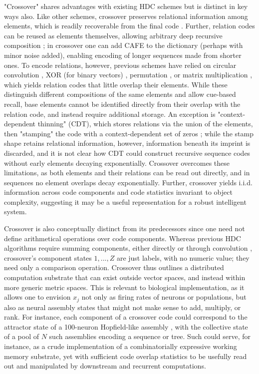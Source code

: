 \documentclass{article}
\begin{document}
"Crossover" shares advantages with existing HDC schemes but is distinct in key ways also. Like other schemes, crossover preserves relational information among elements, which is readily recoverable from the final code \cite{Kanerva:2009}. Further, relation codes can be reused as elements themselves, allowing arbitrary deep recursive composition \cite{Kanerva:2009}; in crossover one can add CAFE to the dictionary (perhaps with minor noise added), enabling encoding of longer sequences made from shorter ones. To encode relations, however, previous schemes have relied on circular convolution \cite{Plate:1995}, XOR (for binary vectors) \cite{Kanerva:1994}, permutation \cite{Sahlgren:2008, Gayler:1998}, or matrix multiplication \cite{Gosmann:2019}, which yields relation codes that little overlap their elements. While these distinguish different compositions of the same elements and allow cue-based recall, base elements cannot be identified directly from their overlap with the relation code, and instead require additional storage. An exception is "context-dependent thinning" (CDT), which stores relations via the union of the elements, then "stamping" the code with a context-dependent set of zeros \cite{Rachkovskij:2001}; while the stamp shape retains relational information, however, information beneath its imprint is discarded, and it is not clear how CDT could construct recursive sequence codes without early elements decaying exponentially. Crossover overcomes these limitations, as both elements and their relations can be read out directly, and in sequences no element overlaps decay exponentially. Further, crossover yields i.i.d. information across code components and code statistics invariant to object complexity, suggesting it may be a useful representation for a robust intelligent system.

Crossover is also conceptually distinct from its predecessors since one need not define arithmetical operations over code components. Whereas previous HDC algorithms require summing components, either directly or through convolution \cite{Plate:1995, Kanerva:1994, Gayler:1998, Rachkovskij:2001, Sahlgren:2008, Gosmann:2019}, crossover's component states $1, ..., Z$ are just labels, with no numeric value; they need only a comparison operation. Crossover thus outlines a distributed computation substrate that can exist outside vector spaces, and instead within more generic metric spaces. This is relevant to biological implementation, as it allows one to envision $x_j$ not only as firing rates of neurons or populations, but also as neural assembly states that might not make sense to add, multiply, or rank. For instance, each component of a crossover code could correspond to the attractor state of a 100-neuron Hopfield-like assembly \cite{Hopfield:1982}, with the collective state of a pool of $N$ such assemblies encoding a sequence or tree. Such could serve, for instance, as a crude implementation of a combinatorially expressive working memory substrate, yet with sufficient code overlap statistics to be usefully read out and manipulated by downstream and recurrent computations.
\end{document}
